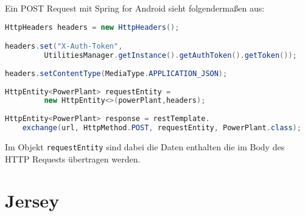 \newpage
Ein POST Request mit Spring for Android sieht folgendermaßen aus: 

\begin{lstlisting}[language=java, caption={POST Request um ein neues Kraftwerke anzulegen}, label=lst:getAllPowerPlants, frame=single, tabsize=3]
HttpHeaders headers = new HttpHeaders();

headers.set("X-Auth-Token", 
		 UtilitiesManager.getInstance().getAuthToken().getToken());
		 
headers.setContentType(MediaType.APPLICATION_JSON);
 
HttpEntity<PowerPlant> requestEntity = 
		 new HttpEntity<>(powerPlant,headers);
 
HttpEntity<PowerPlant> response = restTemplate.
	exchange(url, HttpMethod.POST, requestEntity, PowerPlant.class);
\end{lstlisting}

Im Objekt \texttt{requestEntity} sind dabei die Daten enthalten die im Body des HTTP Requests übertragen werden.

\newpage
\section{Jersey}

